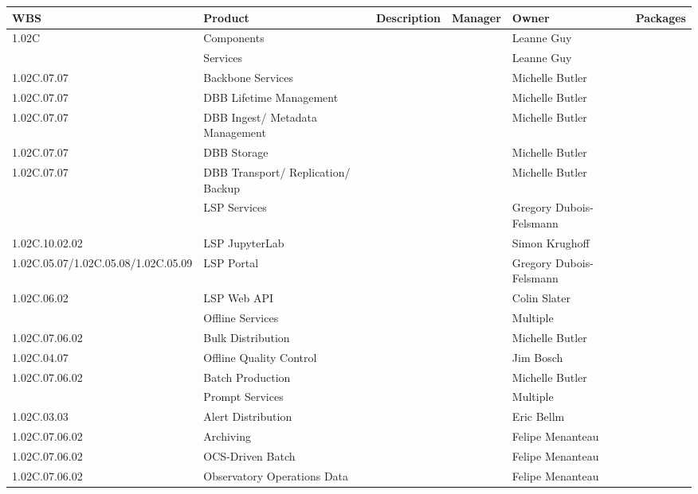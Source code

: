 

\tiny
\begin{longtable}{|p{}|p{}|p{}|p{}|p{}|p{}|}\hline
\textbf{WBS} & Product & Description & Manager & Owner & Packages\\ \hline
1.02C &  Components &  &  & Leanne Guy & \\ \hline
 &  Services &  &  & Leanne Guy & \\ \hline
1.02C.07.07 &  Backbone Services &  &  & Michelle Butler & \\ \hline
1.02C.07.07 &  DBB Lifetime Management &  &  & Michelle Butler & \\ \hline
1.02C.07.07 &  DBB Ingest/ Metadata Management &  &  & Michelle Butler & \\ \hline
1.02C.07.07 &  DBB Storage &  &  & Michelle Butler & \\ \hline
1.02C.07.07 &  DBB Transport/ Replication/ Backup &  &  & Michelle Butler & \\ \hline
 &  LSP Services &  &  & Gregory Dubois-Felsmann & \\ \hline
1.02C.10.02.02 &  LSP JupyterLab &  &  & Simon Krughoff & \\ \hline
1.02C.05.07/1.02C.05.08/1.02C.05.09 &  LSP Portal &  &  & Gregory Dubois-Felsmann & \\ \hline
1.02C.06.02 &  LSP Web API &  &  & Colin Slater & \\ \hline
 &  Offline Services &  &  & Multiple & \\ \hline
1.02C.07.06.02 &  Bulk Distribution &  &  & Michelle Butler & \\ \hline
1.02C.04.07 &  Offline Quality Control &  &  & Jim Bosch & \\ \hline
1.02C.07.06.02 &  Batch Production &  &  & Michelle Butler & \\ \hline
 &  Prompt Services &  &  & Multiple & \\ \hline
1.02C.03.03 &  Alert Distribution &  &  & Eric Bellm & \\ \hline
1.02C.07.06.02 &  Archiving &  &  & Felipe Menanteau & \\ \hline
1.02C.07.06.02 &  OCS-Driven Batch &  &  & Felipe Menanteau & \\ \hline
1.02C.07.06.02 &  Observatory Operations Data &  &  & Felipe Menanteau & \\ \hline

\end{longtable}

